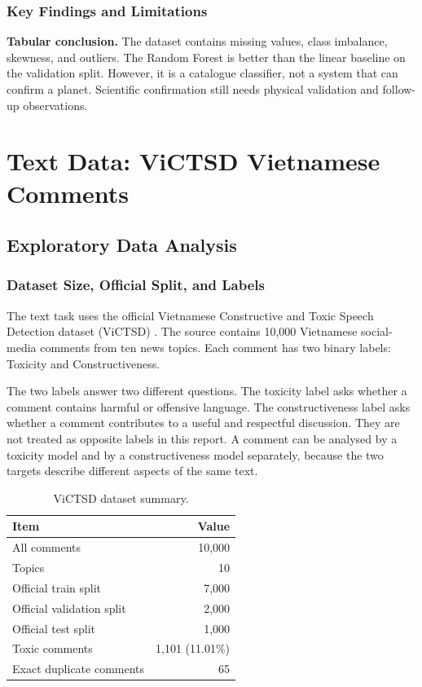 \documentclass[oneside]{hcmut-report}
\begin{document}
\subsubsection{Key Findings and Limitations}

\begin{importantbox}
\textbf{Tabular conclusion.} The dataset contains missing values, class imbalance, skewness, and outliers. The Random Forest is better than the linear baseline on the validation split. However, it is a catalogue classifier, not a system that can confirm a planet. Scientific confirmation still needs physical validation and follow-up observations.
\end{importantbox}

\clearpage
\section{Text Data: ViCTSD Vietnamese Comments}
\label{sec:text}

\subsection{Exploratory Data Analysis}

\subsubsection{Dataset Size, Official Split, and Labels}

The text task uses the official Vietnamese Constructive and Toxic Speech Detection dataset (ViCTSD) \cite{victsd}. The source contains 10,000 Vietnamese social-media comments from ten news topics. Each comment has two binary labels: Toxicity and Constructiveness.

The two labels answer two different questions. The toxicity label asks whether a comment contains harmful or offensive language. The constructiveness label asks whether a comment contributes to a useful and respectful discussion. They are not treated as opposite labels in this report. A comment can be analysed by a toxicity model and by a constructiveness model separately, because the two targets describe different aspects of the same text.

\begin{table}[H]
\centering
\caption{ViCTSD dataset summary.}
\label{tab:victsd-summary}
\begin{tabular}{lr}
\toprule
\textbf{Item} & \textbf{Value} \\
\midrule
All comments & 10,000 \\
Topics & 10 \\
Official train split & 7,000 \\
Official validation split & 2,000 \\
Official test split & 1,000 \\
Toxic comments & 1,101 (11.01\%) \\
Exact duplicate comments & 65 \\
\bottomrule
\end{tabular}
\end{table}
\end{document}
